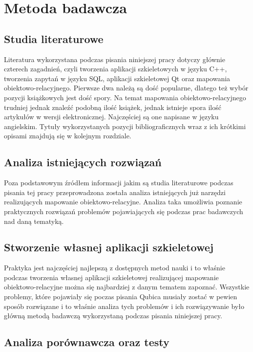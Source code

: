 \documentclass[12pt]{report}
\begin{document}
\section{Metoda badawcza}

\subsection{Studia literaturowe}

Literatura wykorzystana podczas pisania niniejszej pracy dotyczy głównie czterech zagadnień, czyli tworzenia aplikacji szkieletowych w języku C++, tworzenia zapytań w 
języku SQL, aplikacji szkieletowej Qt oraz mapowania obiektowo-relacyjnego. Pierwsze dwa należą są dość popularne, dlatego też wybór pozycji książkowych jest dość spory. 
Na temat mapowania obiektowo-relacyjnego trudniej jednak znaleźć podobną ilość książek, jednak istnieje spora ilość artykułów w wersji elektronicznej. Najczęściej są one
napisane w języku angielskim. Tytuły wykorzystanych pozycji bibliograficznych wraz z ich krótkimi opisami znajdują się w kolejnym rozdziale.

\subsection{Analiza istniejących rozwiązań}

Poza podstawowym źródłem informacji jakim są studia literaturowe podczas pisania tej pracy przeprowadzona została analiza istniejących już narzędzi realizujących mapowanie
obiektowo-relacyjne. Analiza taka umożliwia poznanie praktycznych rozwiązań problemów pojawiających się podczas prac badawczych nad daną tema\-tyką.

\subsection{Stworzenie własnej aplikacji szkieletowej}

Praktyka jest najczęściej najlepszą z dostępnych metod nauki i to właśnie podczas tworzenia własnej aplikacji szkieletowej realizującej mapowanie obiektowo-relacyjne można
się najbardziej z danym tematem zapoznać. Wszystkie problemy, które pojawiały się poczas pisania Qubica musiały zostać w pewien sposób roz\-wią\-zane i to właśnie analiza
tych problemów i ich rozwiązywanie było główną metodą badawczą wykorzystaną podczas pisania niniejszej pracy.

\subsection{Analiza porównawcza oraz testy}
\end{document}

